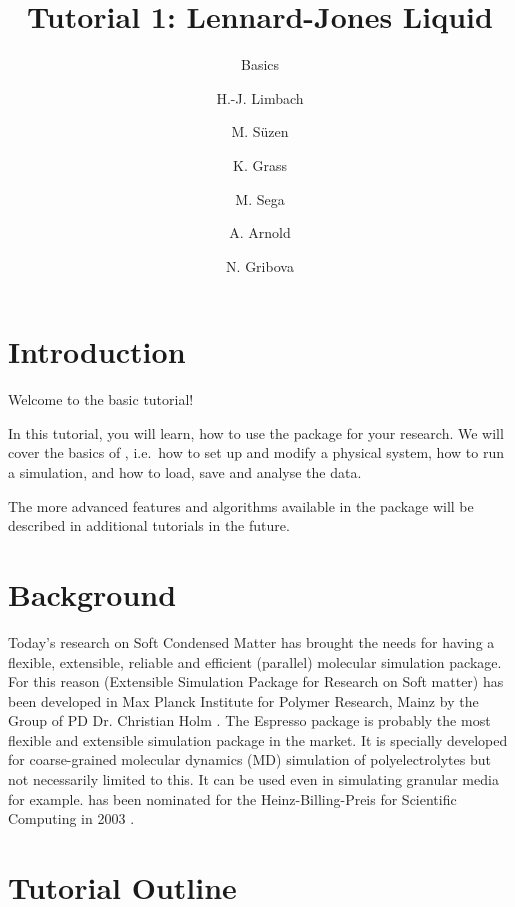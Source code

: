 \documentclass[
paper=a4,                       %
fontsize=11pt,                  %
twoside,                        %
footsepline,                    %
headsepline,                    %
headinclude=false,              %
footinclude=false,              %
pagesize,                       %
]{scrartcl}
\begin{document}
\esptitlehead

\title{Tutorial 1: Lennard-Jones Liquid}
\subtitle{\es Basics}
\author{H.-J. Limbach \and M. S\"uzen \and K. Grass \and M. Sega \and
  A. Arnold \and N. Gribova}
\maketitle
\tableofcontents

\section{Introduction}

Welcome to the basic \es{} tutorial!

In this tutorial, you will learn, how to use the \es{} package for your 
research. We will cover the basics of \es, i.e.~how to set up and modify a 
physical system, how to run a simulation, and how to load, save and analyse the 
data.

The more advanced features and algorithms available in the \es{} package will 
be described in additional tutorials in the future.

\section{Background}
Today's research on Soft Condensed Matter has brought the needs for having a 
flexible, extensible, reliable and efficient (parallel) molecular simulation 
package. For this reason \es{} (Extensible Simulation Package for Research on 
Soft matter) \cite{esp_url} has been developed in Max Planck Institute for 
Polymer Research, Mainz by the Group of PD Dr. Christian Holm 
\cite{limbach2006ees}. The Espresso package is probably the most flexible and 
extensible simulation package in the market. It is specially developed for 
coarse-grained molecular dynamics (MD) simulation of polyelectrolytes but not 
necessarily limited to this. It can be used even in simulating granular media 
for example. \es{} has been nominated for the Heinz-Billing-Preis for 
Scientific Computing in 2003 \cite{arnold2003ees}.

\section{Tutorial Outline}

% 
% 
% 
% 
\end{document}

